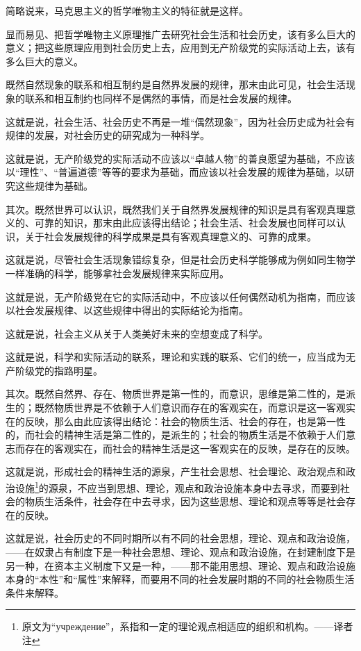 简略说来，马克思主义的哲学唯物主义的特征就是这样。

显而易见、把哲学唯物主义原理推广去研究社会生活和社会历史，该有多么巨大的意义；把这些原理应用到社会历史上去，应用到无产阶级党的实际活动上去，该有多么巨大的意义。

既然自然现象的联系和相互制约是自然界发展的规律，那末由此可见，社会生活现象的联系和相互制约也同样不是偶然的事情，而是社会发展的规律。

这就是说，社会生活、社会历史不再是一堆“偶然现象”，因为社会历史成为社会有规律的发展，对社会历史的研究成为一种科学。

这就是说，无产阶级党的实际活动不应该以“卓越人物”的善良愿望为基础，不应该以“理性”、“普遍道德”等等的要求为基础，而应该以社会发展的规律为基础，以研究这些规律为基础。

其次。既然世界可以认识，既然我们关于自然界发展规律的知识是具有客观真理意义的、可靠的知识，那末由此应该得出结论；社会生活、社会发展也同样可以认识，关于社会发展规律的科学成果是具有客观真理意义的、可靠的成果。

这就是说，尽管社会生活现象错综复杂，但是社会历史科学能够成为例如同生物学一样准确的科学，能够拿社会发展规律来实际应用。

这就是说，无产阶级党在它的实际活动中，不应该以任何偶然动机为指南，而应该以社会发展规律、以这些规律中得出的实际结论为指南。

这就是说，社会主义从关于人类美好未来的空想变成了科学。

这就是说，科学和实际活动的联系，理论和实践的联系、它们的统一，应当成为无产阶级党的指路明星。

其次。既然自然界、存在、物质世界是第一性的，而意识，思维是第二性的，是派生的；既然物质世界是不依赖于人们意识而存在的客观实在，而意识是这一客观实在的反映，那么由此应该得出结论：社会的物质生活、社会的存在，也是第一性的，而社会的精神生活是第二性的，是派生的；社会的物质生活是不依赖于人们意志而存在的客观实在，而社会的精神生活是这一客观实在的反映，是存在的反映。

这就是说，形成社会的精神生活的源泉，产生社会思想、社会理论、政治观点和政治设施\footnote{原文为“учреждение”，系指和一定的理论观点相适应的组织和机构。——译者注}的源泉，不应当到思想、理论，观点和政治设施本身中去寻求，而要到社会的物质生活条件，社会存在中去寻求，因为这些思想、理论和观点等等是社会存在的反映。

这就是说，社会历史的不同时期所以有不同的社会思想，理论、观点和政治设施，——在奴隶占有制度下是一种社会思想、理论、观点和政治设施，在封建制度下是另一种，在资本主义制度下又是一种，——那不能用思想、理论、观点和政治设施本身的“本性”和“属性”来解释，而要用不同的社会发展时期的不同的社会物质生活条件来解释。

